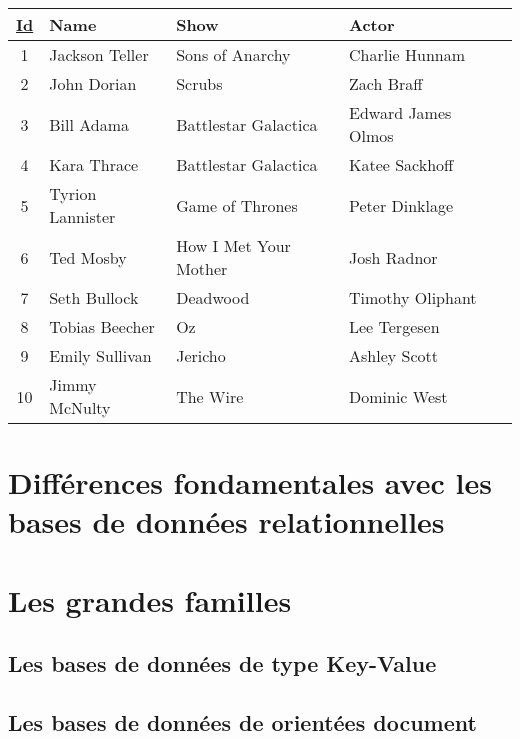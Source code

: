 \documentclass[11pt]{article}
\begin{document}
\begin{center}
  \begin{tabular}{| c | l | l | l | l |}
    \hline
    \textbf{\underline{Id}} & \textbf{Name} & \textbf{Show} & \textbf{Actor} \\
    \hline
    \hline
    1 & Jackson Teller & Sons of Anarchy & Charlie Hunnam \\
    \hline
    2 & John Dorian & Scrubs & Zach Braff  \\
    \hline
    3 & Bill Adama & Battlestar Galactica & Edward James Olmos \\
    \hline
    4 & Kara Thrace & Battlestar Galactica & Katee Sackhoff \\
    \hline
    5 & Tyrion Lannister & Game of Thrones & Peter Dinklage \\
    \hline
    6 & Ted Mosby & How I Met Your Mother & Josh Radnor \\
    \hline
    7 & Seth Bullock & Deadwood & Timothy Oliphant \\
    \hline
    8 & Tobias Beecher & Oz & Lee Tergesen \\
    \hline
    9 & Emily Sullivan & Jericho & Ashley Scott \\
    \hline
    10 & Jimmy McNulty & The Wire & Dominic West \\
    \hline
  \end{tabular}
\end{center}


\section{Différences fondamentales avec les bases de données relationnelles}

\section{Les grandes familles}
\subsection{Les bases de données de type Key-Value}

\subsection{Les bases de données de orientées document}
\end{document}
